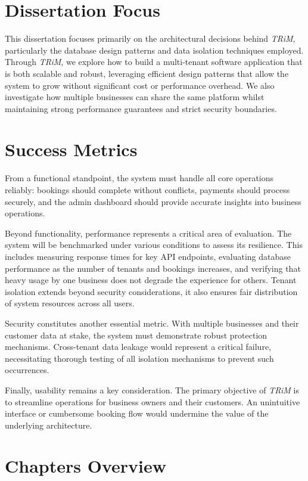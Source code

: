 \section{Dissertation Focus}
This dissertation focuses primarily on the architectural decisions behind \textit{TRiM}, particularly the database design patterns and data isolation techniques employed. Through \textit{TRiM}, we explore how to build a multi-tenant software application that is both scalable and robust, leveraging efficient design patterns that allow the system to grow without significant cost or performance overhead. We also investigate how multiple businesses can share the same platform whilst maintaining strong performance guarantees and strict security boundaries.

\section{Success Metrics}
From a functional standpoint, the system must handle all core operations reliably: bookings should complete without conflicts, payments should process securely, and the admin dashboard should provide accurate insights into business operations.

Beyond functionality, performance represents a critical area of evaluation. The system will be benchmarked under various conditions to assess its resilience. This includes measuring response times for key API endpoints, evaluating database performance as the number of tenants and bookings increases, and verifying that heavy usage by one business does not degrade the experience for others. Tenant isolation extends beyond security considerations, it also ensures fair distribution of system resources across all users.

Security constitutes another essential metric. With multiple businesses and their customer data at stake, the system must demonstrate robust protection mechanisms. Cross-tenant data leakage would represent a critical failure, necessitating thorough testing of all isolation mechanisms to prevent such occurrences.

Finally, usability remains a key consideration. The primary objective of \textit{TRiM} is to streamline operations for business owners and their customers. An unintuitive interface or cumbersome booking flow would undermine the value of the underlying architecture.

\section{Chapters Overview}

